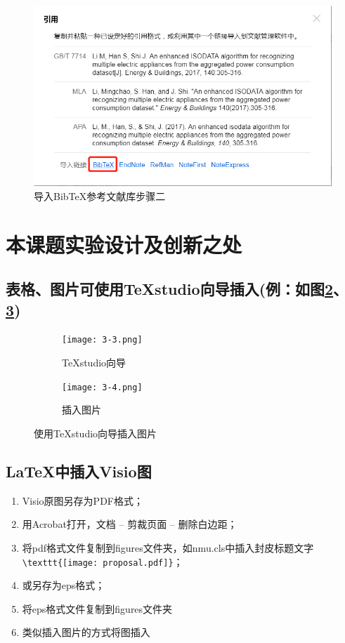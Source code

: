 \begin{framedbox}
\begin{figure}[tbh!]
	\centering
	\includegraphics[width=0.6\linewidth]{figures/sample/3-2}
	\caption{导入BibTeX参考文献库步骤二}
	\label{fig:3-2}
\end{figure}

\newpage
\section{本课题实验设计及创新之处} 
\NMUtableline

\subsection{表格、图片可使用TeXstudio向导插入(例：如图\ref{subfig:3a}、\ref{subfig:3b})}

\begin{figure}[htb!]
	\centering
	\begin{subfigure}[b]{.4\textwidth}
		\centering
		\texttt{[image: 3-3.png]}
		\caption{TeXstudio向导}\label{subfig:3a}
	\end{subfigure}
	\begin{subfigure}[b]{.4\textwidth}
		\centering
		\texttt{[image: 3-4.png]}
		\caption{插入图片}\label{subfig:3b}
	\end{subfigure}
	\caption{使用TeXstudio向导插入图片}\label{fig:3}
\end{figure}

\subsection{\LaTeX{}中插入Visio图}

\begin{enumerate}[label=\arabic*)]
	\item Visio原图另存为PDF格式；
	\item 用Acrobat打开，文档 -- 剪裁页面 -- 删除白边距；
	\item 将pdf格式文件复制到figures文件夹，如nmu.cls中插入封皮标题文字\\ \verb|\texttt{[image: proposal.pdf]}|；	
	\item 或另存为eps格式；
	\item 将eps格式文件复制到figures文件夹
	\item 类似插入图片的方式将图插入
\end{enumerate}


\end{framedbox}
